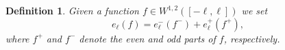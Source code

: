 \documentclass{amsart}
\newtheorem{definition}{Definition}
\begin{document}
 \begin{definition}\label{Def:TotalEnergy}
 Given a function $f \in W^{1, 2}([- \ell, \ell])$ we set
 \[
 e_{\ell}(f) = e^{-}_{\ell}(f^-) +   e^{+}_{\ell}(f^+), 
 \]
 where $f^+$ and $f^-$ denote the even and odd parts of $f$, respectively. 
 \end{definition}

\end{document}
